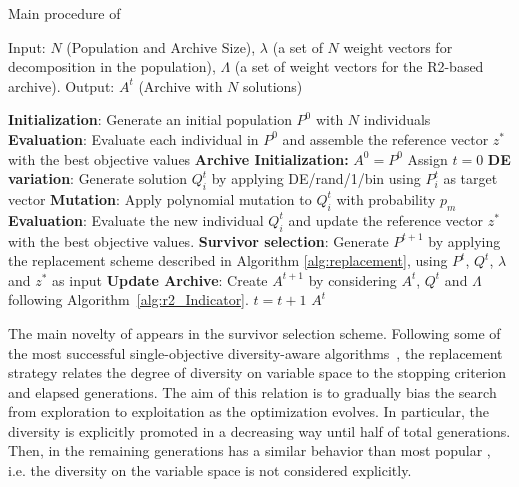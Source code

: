 \begin{algorithm}[!t]
        \caption{Main procedure of \AVSDMOEAD{}}
        \begin{small}
\begin{algorithmic}[1]
				\STATE Input: $N$ (Population and Archive Size), $\lambda$ (a set of $N$ weight vectors for decomposition in the population),
				$\Lambda$ (a set of weight vectors for the R2-based archive).
        \STATE Output: $A^{t}$ (Archive with $N$ solutions)

        \STATE \textbf{Initialization}: Generate an initial population $P^0$ with $N$ individuals \label{alg_1:1}
        \STATE \textbf{Evaluation}: Evaluate each individual in $P^0$ and assemble the reference vector $z^*$ with the best objective values \label{alg_1:3}
				\STATE \textbf{Archive Initialization:} $A^0 = P^0$
        \STATE Assign $t=0$ \label{alg_1:4}
         \label{alg_1:5}
            \label{alg_1:6}
               \STATE \textbf{DE variation}: Generate solution $Q^t_{i}$ by applying DE/rand/1/bin using $P_{i}^t$ as target vector \label{alg_1:8}
							 \STATE \textbf{Mutation}: Apply polynomial mutation to $Q^t_{i}$ with probability $p_m$
               \STATE \textbf{Evaluation}: Evaluate the new individual $Q^t_{i}$ and update the reference vector $z^*$ with the best objective values. \label{alg_1:9}
           \ENDFOR \label{alg_1:10}
           \STATE \textbf{Survivor selection}: Generate $P^{t+1}$ by applying the replacement scheme described in  Algorithm \ref{alg:replacement}, using $P^t$, $Q^t$, $\lambda$ and $z^*$ as input \label{alg_1:11}
	   \STATE \textbf{Update Archive}: Create $A^{t+1}$ by considering $A^{t}$, $Q^t$ and $\Lambda$ following Algorithm~\ref{alg:r2_Indicator}. 
           \STATE $t=t+1$ \label{alg_1:12}
        \ENDWHILE \label{alg_1:13}
        \RETURN $A^{t}$ 
        \end{algorithmic}
        \end{small}
\label{alg:vsd-moead}
\end{algorithm}


The main novelty of \AVSDMOEAD{} appears in the  survivor selection scheme.
%
Following some of the most successful single-objective diversity-aware algorithms~\cite{segura2016improving}, the 
replacement strategy relates the degree of diversity on variable space to the stopping criterion
and elapsed generations.
%
The aim of this relation is to gradually bias the search from exploration to exploitation as the
optimization evolves.
%
In particular, the diversity is explicitly promoted in a decreasing way until half of total generations. 
%
Then, in the remaining generations \AVSDMOEAD{} has a similar behavior than most popular
\MOEAS{}, i.e. the diversity on the variable space is not considered explicitly.

